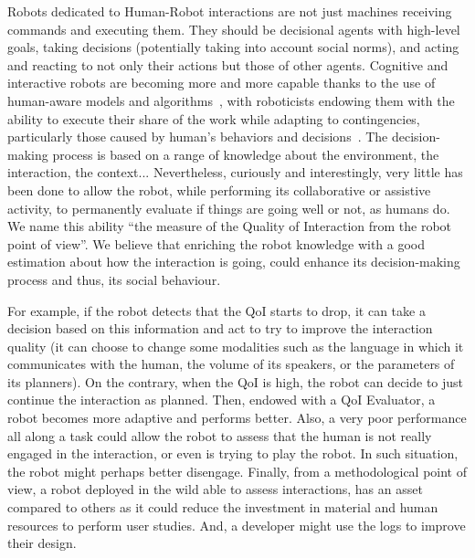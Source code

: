 \documentclass[a4paper,11pt,twoside]{StyleThese}
\begin{document}
Robots dedicated to Human-Robot interactions are not just machines receiving commands and executing them. They should be decisional agents with high-level goals, taking decisions (potentially taking into account social norms), and acting and reacting to not only their actions but those of other agents. Cognitive and interactive robots are becoming more and more capable thanks to the use of human-aware models and algorithms~\cite{kruse2013,thomaz_2016_computational}, with roboticists endowing them with the ability to execute their share of the work while adapting to contingencies, particularly those caused by human's behaviors and decisions~\cite{hoffman_2007_fluency,cakmak_2017,lemaignan_2017_artificial}. The decision-making process is based on a range of knowledge about the environment, the interaction, the context... Nevertheless, curiously and interestingly, very little has been done to allow the robot, while performing its collaborative or assistive activity, to permanently evaluate if things are going well or not, as humans do. We name this ability ``the measure of the Quality of Interaction from the robot point of view''. We believe that enriching the robot knowledge with a good estimation about how the interaction is going, could enhance its decision-making process and thus, its social behaviour.

For example, if the robot detects that the QoI starts to drop, it can take a decision based on this information and act to try to improve the interaction quality (\eg it can choose to change some modalities such as the language in which it communicates with the human, the volume of its speakers, or the parameters of its planners). On the contrary, when the QoI is high, the robot can decide to just continue the interaction as planned. Then, endowed with a QoI Evaluator, a robot becomes more adaptive and performs better. Also, a very poor performance all along a task could allow the robot to assess that the human is not really engaged in the interaction, or even is trying to play the robot. In such situation, the robot might perhaps better disengage. 
Finally, from a methodological point of view, a robot deployed in the wild able to assess interactions, has an asset compared to others as it could reduce the investment in material and human resources to perform user studies. And, a developer might use the logs to improve their design. 
\end{document}
